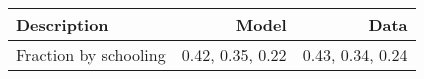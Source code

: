 \begin{tabular}{lrr}
\hline
Description & Model  & Data  \\ 
\hline
Fraction by schooling & 0.42, 0.35, 0.22  & 0.43, 0.34, 0.24  \\ 
\hline
\end{tabular}%
